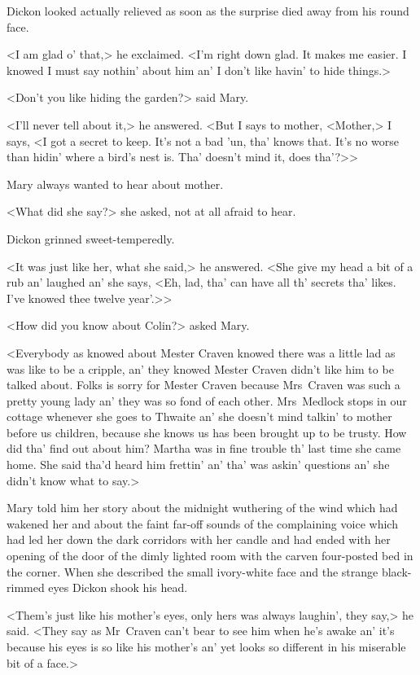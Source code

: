 Dickon looked actually relieved as soon as the surprise died away from his round face.

<I am glad o' that,> he exclaimed. <I'm right down glad. It makes me easier. I knowed I must say nothin' about him an' I don't like havin' to hide things.>

<Don't you like hiding the garden?> said Mary.

<I'll never tell about it,> he answered. <But I says to mother, <Mother,> I says, <I got a secret to keep. It's not a bad 'un, tha' knows that. It's no worse than hidin' where a bird's nest is. Tha' doesn't mind it, does tha'?>>

Mary always wanted to hear about mother.

<What did she say?> she asked, not at all afraid to hear.

Dickon grinned sweet-temperedly.

<It was just like her, what she said,> he answered. <She give my head a bit of a rub an' laughed an' she says, <Eh, lad, tha' can have all th' secrets tha' likes. I've knowed thee twelve year'.>>

<How did you know about Colin?> asked Mary.

<Everybody as knowed about Mester Craven knowed there was a little lad as was like to be a cripple, an' they knowed Mester Craven didn't like him to be talked about. Folks is sorry for Mester Craven because Mrs~Craven was such a pretty young lady an' they was so fond of each other. Mrs~Medlock stops in our cottage whenever she goes to Thwaite an' she doesn't mind talkin' to mother before us children, because she knows us has been brought up to be trusty. How did tha' find out about him? Martha was in fine trouble th' last time she came home. She said tha'd heard him frettin' an' tha' was askin' questions an' she didn't know what to say.>

Mary told him her story about the midnight wuthering of the wind which had wakened her and about the faint far-off sounds of the complaining voice which had led her down the dark corridors with her candle and had ended with her opening of the door of the dimly lighted room with the carven four-posted bed in the corner. When she described the small ivory-white face and the strange black-rimmed eyes Dickon shook his head.

<Them's just like his mother's eyes, only hers was always laughin', they say,> he said. <They say as Mr~Craven can't bear to see him when he's awake an' it's because his eyes is so like his mother's an' yet looks so different in his miserable bit of a face.>

